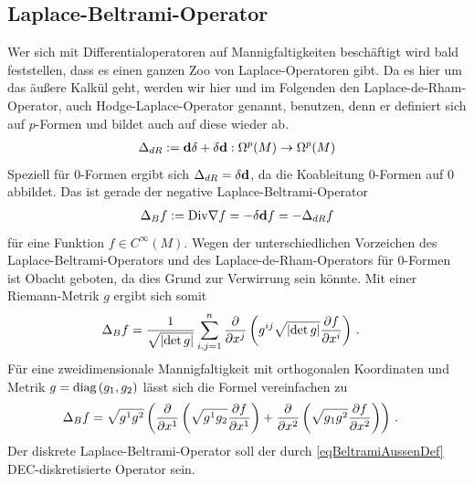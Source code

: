   \subsection{Laplace-Beltrami-Operator}
    \label{subsecLaplaceBeltrami}
    Wer sich mit Differentialoperatoren auf Mannigfaltigkeiten beschäftigt wird bald feststellen, dass es
    einen ganzen Zoo von Laplace-Operatoren gibt.
    Da es hier um das äußere Kalkül geht, werden wir hier und im Folgenden den Laplace-de-Rham-Operator,
    auch Hodge-Laplace-Operator genannt, benutzen, denn er definiert sich auf \( p \)-Formen und bildet
    auch auf diese wieder ab.
    \begin{align}
      \Delta_{dR} := \mathbf{d}\delta + \delta\mathbf{d}: \Omega^{p}(M) \rightarrow \Omega^{p}(M)
    \end{align}
    Speziell für \( 0 \)-Formen ergibt sich \( \Delta_{dR} = \delta\mathbf{d} \), da die Koableitung \( 0
    \)-Formen auf \( 0 \) abbildet.
    Das ist gerade der negative Laplace-Beltrami-Operator
    \begin{align}
      \label{eqBeltramiAussenDef}
      \Delta_{B}f := \text{Div}\nabla f = -\delta\mathbf{d} f = -\Delta_{dR} f
    \end{align}
    für eine Funktion \( f\in C^{\infty}(M) \).
    Wegen der unterschiedlichen Vorzeichen des Laplace-Beltrami-Operators und des Laplace-de-Rham-Operators
    für \( 0 \)-Formen ist Obacht geboten, da dies Grund zur Verwirrung sein könnte.
    Mit einer Riemann-Metrik \( g \) ergibt sich somit
    \begin{align}
      \Delta_{B} f &= \frac{1}{\sqrt{\left| \det g \right|}} \sum_{i,j=1}^{n} \frac{\partial}{\partial x^{j}} \left( g^{ij}\sqrt{\left| \det g \right|} \frac{\partial f}{\partial x^{i}}
      \right) \,\text{.}
    \end{align}
    Für eine zweidimensionale Mannigfaltigkeit mit orthogonalen Koordinaten und Metrik \( g=\text{diag}\left( g_{1},g_{2} \right) \) lässt sich die Formel vereinfachen zu
    \begin{align}
    \label{eqLaplaceBeltramiOrthogonal}
      \Delta_{B} f &=\sqrt{g^{1}g^{2}} \left(  \frac{\partial}{\partial x^{1}} \left( \sqrt{g^{1}g_{2}} \frac{\partial f}{\partial x^{1}} \right) 
                                             + \frac{\partial}{\partial x^{2}} \left( \sqrt{g_{1}g^{2}} \frac{\partial f}{\partial x^{2}} \right) \right) \,\text{.}
    \end{align}
    Der diskrete Laplace-Beltrami-Operator soll der durch \eqref{eqBeltramiAussenDef} DEC-diskretisierte Operator sein.
